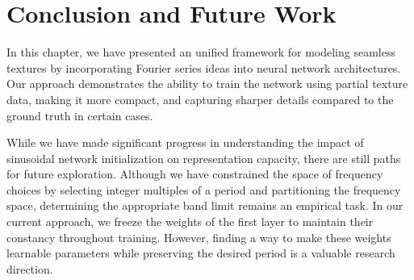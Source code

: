 





\section{Conclusion and Future Work}

In this chapter, we have presented an unified framework for modeling seamless textures by incorporating Fourier series ideas into neural network architectures. Our approach demonstrates the ability to train the network using partial texture data, making it more compact, and capturing sharper details compared to the ground truth in certain cases.

While we have made significant progress in understanding the impact of sinusoidal network initialization on representation capacity, there are still paths for future exploration. Although we have constrained the space of frequency choices by selecting integer multiples of a period and partitioning the frequency space, determining the appropriate band limit remains an empirical task. In our current approach, we freeze the weights of the first layer to maintain their constancy throughout training. However, finding a way to make these weights learnable parameters while preserving the desired period is a valuable research direction.

